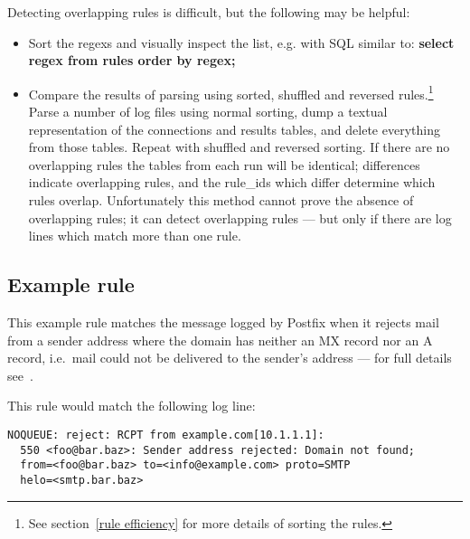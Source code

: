 \documentclass[a4paper,12pt,draft]{article}
\begin{document}
Detecting overlapping rules is difficult, but the following may be helpful:

\begin{itemize}

    \item Sort the regexs and visually inspect the list, e.g. with SQL
        similar to: \textbf{select regex from rules order by regex;}

    \item Compare the results of parsing using sorted, shuffled and
        reversed rules.\footnote{See section~\ref{rule efficiency} for more
        details of sorting the rules.}  Parse a number of log files using
        normal sorting, dump a textual representation of the connections
        and results tables, and delete everything from those tables.
        Repeat with shuffled and reversed sorting.  If there are no
        overlapping rules the tables from each run will be identical;
        differences indicate overlapping rules, and the rule\_ids which
        differ determine which rules overlap.  Unfortunately this method
        cannot prove the absence of overlapping rules; it can detect
        overlapping rules --- but only if there are log lines which match
        more than one rule.

\end{itemize}

\subsection{Example rule}

This example rule matches the message logged by Postfix when it rejects
mail from a sender address where the domain has neither an MX record nor an
A record, i.e.\ mail could not be delivered to the sender's address --- for
full details see~\cite{reject-unknown-sender-domain}.

This rule would match the following log line:

\begin{verbatim}
NOQUEUE: reject: RCPT from example.com[10.1.1.1]: 
  550 <foo@bar.baz>: Sender address rejected: Domain not found;
  from=<foo@bar.baz> to=<info@example.com> proto=SMTP
  helo=<smtp.bar.baz>
\end{verbatim}
\end{document}
